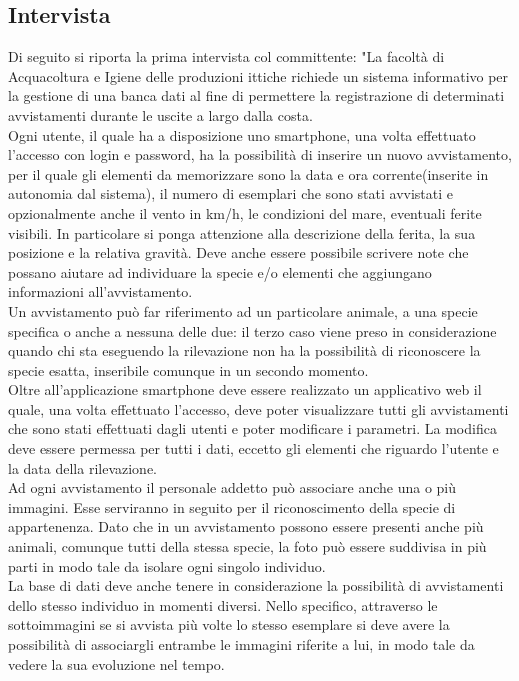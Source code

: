 \documentclass[a4paper,final,12pt]{report}
\begin{document}
\subsection{Intervista}
Di seguito si riporta la prima intervista col committente:
"La facoltà di Acquacoltura e Igiene delle produzioni ittiche richiede un sistema informativo per la gestione di una banca dati al fine di permettere la registrazione di determinati avvistamenti durante le uscite a largo dalla costa.\\
Ogni utente, il quale ha a disposizione uno smartphone, una volta effettuato l'accesso con login e password, ha la possibilità di inserire un nuovo avvistamento, per il quale gli elementi da memorizzare sono la data e ora corrente(inserite in autonomia dal sistema), il numero di esemplari che sono stati avvistati e opzionalmente anche il vento in km/h, le condizioni del mare, eventuali ferite visibili. In particolare si ponga attenzione alla descrizione della ferita, la sua posizione e la relativa gravità. Deve anche essere possibile scrivere note che possano aiutare ad individuare la specie e/o elementi che aggiungano informazioni all'avvistamento. 
\\
Un avvistamento può far riferimento ad un particolare animale, a una specie specifica o anche a nessuna delle due: il terzo caso viene preso in considerazione quando chi sta eseguendo la rilevazione non ha la possibilità di riconoscere la specie esatta, inseribile comunque in un secondo momento.
\\
Oltre all'applicazione smartphone deve essere realizzato un applicativo web il quale, una volta effettuato l'accesso, deve poter visualizzare tutti gli avvistamenti che sono stati effettuati dagli utenti e poter modificare i parametri. La modifica deve essere permessa per tutti i dati, eccetto gli elementi che riguardo l'utente e la data della rilevazione.
\\ 
Ad ogni avvistamento il personale addetto può associare anche una o più immagini. Esse serviranno in seguito per il riconoscimento della specie di appartenenza. Dato che in un avvistamento possono essere presenti anche più animali, comunque tutti della stessa specie, la foto può essere suddivisa in più parti in modo tale da isolare ogni singolo individuo.
\\
La base di dati deve anche tenere in considerazione la possibilità di avvistamenti dello stesso individuo in momenti diversi. Nello specifico, attraverso le sottoimmagini se si avvista più volte lo stesso esemplare si deve avere la possibilità di associargli entrambe le immagini riferite a lui, in modo tale da vedere la sua evoluzione nel tempo.
\end{document}
